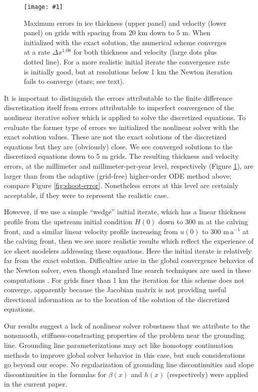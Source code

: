 \documentclass[twocolumn]{igs}
\newcommand{\onecol}[1]{\texttt{[image: \#1]}}
\begin{document}
\begin{figure}[ht]
\onecol{convmarine}
\caption{Maximum errors in ice thickness (upper panel) and velocity (lower panel) on grids with spacing from $20$ km down to $5$ m.  When initialized with the exact solution, the numerical scheme converges at a rate $\Delta x^{1.08}$ for both thickness and velocity (large dots plus dotted line).  For a more realistic initial iterate the convergence rate is initially good, but at resolutions below 1 km the Newton iteration fails to converge (stars; see text).} \label{fig:convmarine}
\end{figure}

It is important to distinguish the errors attributable to the finite difference discretization itself from errors attributable to imperfect convergence of the nonlinear iterative solver which is applied to solve the discretized equations.  To evaluate the former type of errors we initialized the nonlinear solver with the exact solution values.  These are not the exact solutions of the discretized equations but they are (obviously) close.  We see converged solutions to the discretized equations down to 5 m grids.  The resulting thickness and velocity errors, at the millimeter and millimeter-per-year level, respectively (Figure \ref{fig:convmarine}), are larger than from the adaptive (grid-free) higher-order ODE method above; compare Figure \ref{fig:shoot-error}.  Nonetheless errors at this level are certainly acceptable, if they were to represent the realistic case.

However, if we use a simple ``wedge'' initial iterate, which has a linear thickness profile from the upstream initial condition $H(0)$ down to 300 m at the calving front, and a similar linear velocity profile increasing from $u(0)$ to 300 $\text{m}\,\text{a}^{-1}$ at the calving front, then we see more realistic results which reflect the experience of ice sheet modelers addressing these equations.  Here the initial iterate is relatively far from the exact solution.  Difficulties arise in the global convergence behavior of the Newton solver, even though standard line search techniques are used in these computations \citep{Kelley}.  For grids finer than 1 km the iteration for this scheme does not converge, apparently because the Jacobian matrix is not providing useful directional information as to the location of the solution of the discretized equations.

Our results suggest a lack of nonlinear solver robustness that we attribute to the nonsmooth, stiffness-constrasting properties of the problem near the grounding line.  Grounding line parameterizations \citep[e.g.][]{Gladstoneetal2010,Feldmannetal2014} may act like homotopy continuation methods \citep{Kelley} to improve global solver behavior in this case, but such considerations go beyond our scope.  No regularization of grounding line discontinuities and slope discontinuities in the formulas for $\beta(x)$ and $h(x)$ (respectively) were applied in the current paper.
\end{document}
